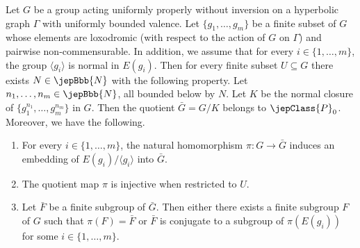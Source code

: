 \begin{proposition}\label{prop:quotient}
Let $G$ be a group acting uniformly properly without inversion on a hyperbolic graph $\Gamma$ with uniformly bounded valence. Let $\{g_1,\ldots,g_m\}$ be a finite subset of $G$ whose elements are loxodromic (with respect to the action of $G$ on $\Gamma$) and pairwise non-commensurable. In addition, we assume that for every $i\in\{1,\ldots,m\}$, the group $\langle g_i\rangle$ is normal in $E(g_i)$. Then for every finite subset $U\subseteq G$ there exists $N\in\jepBbb{N}$ with the following property. Let $n_1,\ldots,n_m\in\jepBbb{N}$, all bounded below by $N$. Let $K$ be the normal closure of $\{g_1^{n_1},\ldots,g_m^{n_m}\}$ in $G$. Then the quotient $\bar G=G/K$ belongs to $\jepClass{P}_0$. Moreover, we have the following.
\begin{enumerate}
\item For every $i\in\{1,\ldots,m\}$, the natural homomorphism $\pi:G\to\bar G$ induces an embedding of $E(g_i)/\langle g_i\rangle$ into $\bar G$.
\item The quotient map $\pi$ is injective when restricted to $U$.
\item Let $\bar F$ be a finite subgroup of $\bar G$. Then either there exists a finite subgroup $F$ of $G$ such that $\pi(F)=\bar F$ or $\bar F$ is conjugate to a subgroup of $\pi(E(g_i))$ for some $i\in\{1,\ldots,m\}$.
\end{enumerate}
\end{proposition}
